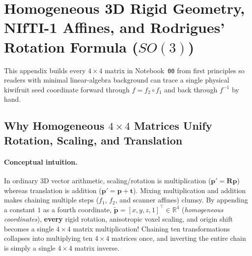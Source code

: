 \documentclass[10pt,a4paper]{article}
\renewcommand{\_}{\origunderscore\allowbreak}
\begin{document}
\clearpage
\printbibliography[heading=bibintoc,title={References}]

\clearpage
\appendix
\section[3D Rigid Geometry, NIfTI Affines \& Rodrigues $SO(3)$]{Homogeneous 3D Rigid Geometry, NIfTI-1 Affines, and Rodrigues' Rotation Formula ($SO(3)$)}
\label{app:so3}

This appendix builds every $4\times 4$ matrix in Notebook~\texttt{00} from first principles so readers with minimal linear-algebra background can trace a single physical kiwifruit seed coordinate forward through $f = f_2 \circ f_1$ and back through $f^{-1}$ by hand.

\subsection{Why Homogeneous $4\times 4$ Matrices Unify Rotation, Scaling, and Translation}

\paragraph{Conceptual intuition.} In ordinary 3D vector arithmetic, scaling/rotation is multiplication ($\mathbf{p}' = \mathbf{R}\mathbf{p}$) whereas translation is addition ($\mathbf{p}' = \mathbf{p} + \mathbf{t}$). Mixing multiplication and addition makes chaining multiple steps ($f_1$, $f_2$, and scanner affines) clumsy. By appending a constant $1$ as a fourth coordinate, $\tilde{\mathbf{p}} = [x, y, z, 1]^\top \in \mathbb{R}^4$ (\emph{homogeneous coordinates}), \textbf{every} rigid rotation, anisotropic voxel scaling, and origin shift becomes a single $4\times 4$ matrix multiplication! Chaining ten transformations collapses into multiplying ten $4\times 4$ matrices once, and inverting the entire chain is simply a single $4\times 4$ matrix inverse.
\end{document}
